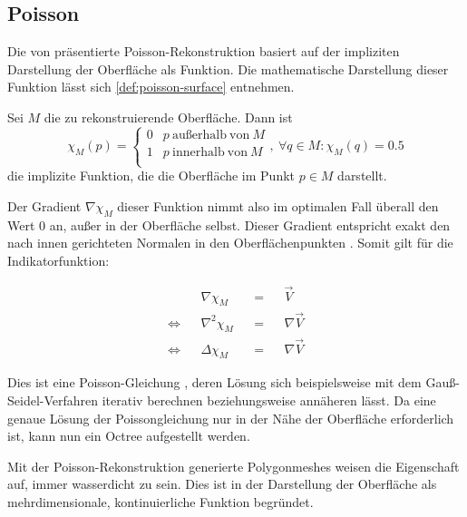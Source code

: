 \subsection{Poisson}
\label{subsec:poisson}

Die \citeyear{kazhdan2006poisson} von \citeauthor{kazhdan2006poisson} präsentierte Poisson-Rekonstruktion \cite{kazhdan2006poisson} basiert auf der impliziten Darstellung der Oberfläche als Funktion.
Die mathematische Darstellung dieser Funktion lässt sich \autoref{def:poisson-surface} entnehmen.

\begin{definition}
\label{def:poisson-surface}
Sei $M$ die zu rekonstruierende Oberfläche.
Dann ist
\begin{equation}
\chi_M(p) = \left\{
\begin{array}{ll}
0 & p\ \mathrm{außerhalb\ von}\ M\\
1 & p\ \mathrm{innerhalb\ von}\ M\\
\end{array}
\right.
,\ \forall q \in M : \chi_M(q) = 0.5
\end{equation}
die implizite Funktion, die die Oberfläche im Punkt $p \in M$ darstellt.
\end{definition}

Der Gradient $\nabla \chi_M$ dieser Funktion nimmt also im optimalen Fall überall den Wert $0$ an, außer in der Oberfläche selbst.
Dieser Gradient entspricht exakt den nach innen gerichteten Normalen in den Oberflächenpunkten \cite[Abs. 3]{kazhdan2006poisson}.
Somit gilt für die Indikatorfunktion:

\begin{displaymath}
\begin{aligned}
&&\nabla \chi_M && = &&\overrightarrow{V}\\
\Leftrightarrow && \nabla^2 \chi_M && = &&\nabla \overrightarrow{V}\\
\Leftrightarrow && \Delta \chi_M && = &&\nabla \overrightarrow{V}
\end{aligned}
\end{displaymath}

Dies ist eine Poisson-Gleichung \cite[Kap. 2]{ponce2016pde}, deren Lösung sich beispielsweise mit dem Gauß-Seidel-Verfahren iterativ berechnen beziehungsweise annäheren lässt.
Da eine genaue Lösung der Poissongleichung nur in der Nähe der Oberfläche erforderlich ist, kann nun ein Octree aufgestellt werden.

Mit der Poisson-Rekonstruktion generierte Polygonmeshes weisen die Eigenschaft auf, immer wasserdicht zu sein.
Dies ist in der Darstellung der Oberfläche als mehrdimensionale, kontinuierliche Funktion begründet.

